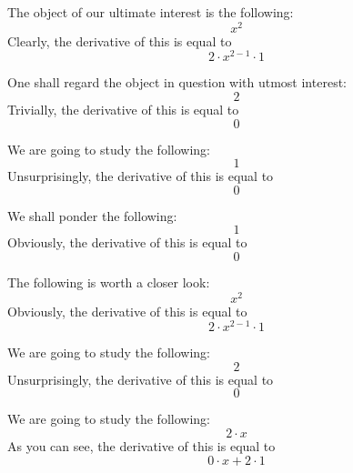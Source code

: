 \documentclass{article}
\begin{document}
The object of our ultimate interest is the following:
\begin{equation}
x ^{2 } 
\end{equation}
Clearly, the derivative of this is equal to
\begin{equation}
2 \cdot x ^{2 - 1 } \cdot 1 
\end{equation}

One shall regard the object in question with utmost interest:
\begin{equation}
2 
\end{equation}
Trivially, the derivative of this is equal to
\begin{equation}
0 
\end{equation}

We are going to study the following:
\begin{equation}
1 
\end{equation}
Unsurprisingly, the derivative of this is equal to
\begin{equation}
0 
\end{equation}

We shall ponder the following:
\begin{equation}
1 
\end{equation}
Obviously, the derivative of this is equal to
\begin{equation}
0 
\end{equation}

The following is worth a closer look:
\begin{equation}
x ^{2 } 
\end{equation}
Obviously, the derivative of this is equal to
\begin{equation}
2 \cdot x ^{2 - 1 } \cdot 1 
\end{equation}

We are going to study the following:
\begin{equation}
2 
\end{equation}
Unsurprisingly, the derivative of this is equal to
\begin{equation}
0 
\end{equation}

We are going to study the following:
\begin{equation}
2 \cdot x 
\end{equation}
As you can see, the derivative of this is equal to
\begin{equation}
0 \cdot x + 2 \cdot 1 
\end{equation}
\end{document}
